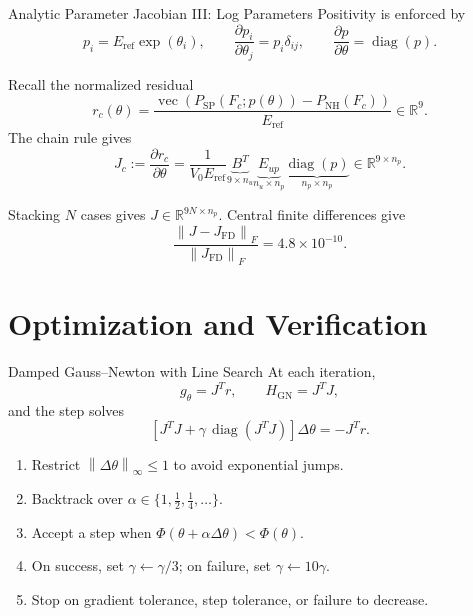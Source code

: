 \documentclass[aspectratio=169,10pt]{beamer}
\newcommand{\vect}[1]{\operatorname{vec}\!\left(#1\right)}
\newcommand{\norm}[1]{\left\lVert #1\right\rVert}
\newcommand{\eref}{E_{\mathrm{ref}}}
\begin{document}
\begin{frame}{Analytic Parameter Jacobian III: Log Parameters}
  \small
  Positivity is enforced by
  \[
    p_i=\eref\exp(\theta_i),
    \qquad
    \frac{\partial p_i}{\partial\theta_j}=p_i\delta_{ij},
    \qquad
    \frac{\partial p}{\partial\theta}
    =
    \operatorname{diag}(p).
  \]

  Recall the normalized residual
  \[
    r_c(\theta)
    =
    \frac{
      \vect{P_{\mathrm{SP}}(F_c;p(\theta))-P_{\mathrm{NH}}(F_c)}
    }{\eref}
    \in\mathbb R^9.
  \]
  The chain rule gives
  \[
    \boxed{
      J_c
      :=
      \frac{\partial r_c}{\partial\theta}
      =
      \frac1{V_0\eref}
      \underbrace{B^T}_{9\times n_u}
      \underbrace{E_{up}}_{n_u\times n_p}
      \underbrace{\operatorname{diag}(p)}_{n_p\times n_p}
    }
    \in\mathbb R^{9\times n_p}.
  \]

  Stacking $N$ cases gives $J\in\mathbb R^{9N\times n_p}$.
  Central finite differences give
  \[
    \frac{\norm{J-J_{\mathrm{FD}}}_F}
         {\norm{J_{\mathrm{FD}}}_F}
    =4.8\times10^{-10}.
  \]
\end{frame}

\section{Optimization and Verification}

\begin{frame}{Damped Gauss--Newton with Line Search}
  \small
  At each iteration,
  \[
    g_\theta=J^Tr,
    \qquad
    H_{\mathrm{GN}}=J^TJ,
  \]
  and the step solves
  \[
    \boxed{
      \left[
        J^TJ+\gamma\,\operatorname{diag}(J^TJ)
      \right]\Delta\theta
      =
      -J^Tr
    }.
  \]

  \begin{enumerate}
    \item Restrict $\norm{\Delta\theta}_\infty\leq1$ to avoid exponential jumps.
    \item Backtrack over $\alpha\in\{1,\frac12,\frac14,\ldots\}$.
    \item Accept a step when $\Phi(\theta+\alpha\Delta\theta)<\Phi(\theta)$.
    \item On success, set $\gamma\leftarrow\gamma/3$; on failure,
      set $\gamma\leftarrow10\gamma$.
    \item Stop on gradient tolerance, step tolerance, or failure to decrease.
  \end{enumerate}
\end{frame}
\end{document}
